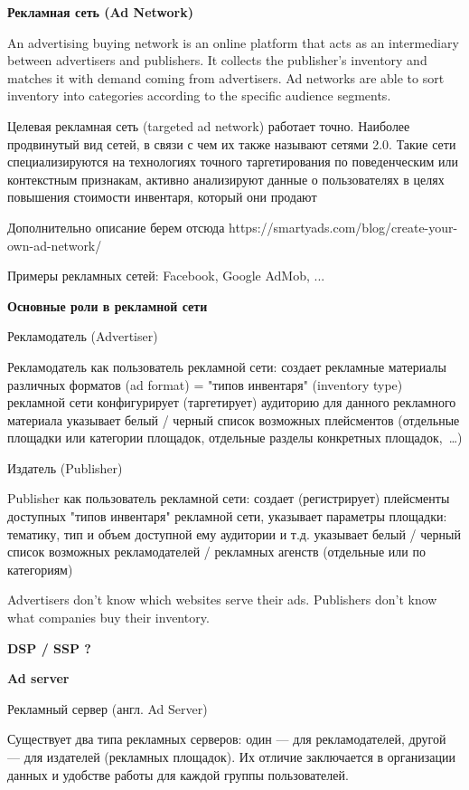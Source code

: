 \documentclass[times]{itmo-student-thesis}
\begin{document}
\textbf{Рекламная сеть (Ad Network)}

An advertising buying network is an online platform that acts as an intermediary between advertisers and publishers. It collects the publisher's inventory and matches it with demand coming from advertisers. Ad networks are able to sort inventory into categories according to the specific audience segments.

Целевая рекламная сеть (targeted ad network) работает точно. Наиболее продвинутый вид сетей, в связи с чем их также называют сетями 2.0. Такие сети специализируются на технологиях точного таргетирования по поведенческим или контекстным признакам, активно анализируют данные о пользователях в целях повышения стоимости инвентаря, который они продают

Дополнительно описание берем отсюда https://smartyads.com/blog/create-your-own-ad-network/

Примеры рекламных сетей: Facebook, Google AdMob, ...

\textbf{Основные роли в рекламной сети}

Рекламодатель (Advertiser)

Рекламодатель как пользователь рекламной сети:
создает рекламные материалы различных форматов (ad format) = "типов инвентаря" (inventory type) рекламной сети
конфигурирует (таргетирует) аудиторию для данного рекламного материала
указывает белый / черный список возможных плейсментов (отдельные площадки или категории площадок, отдельные разделы конкретных площадок, …)

Издатель (Publisher)

Publisher как пользователь рекламной сети:
создает (регистрирует) плейсменты доступных "типов инвентаря" рекламной сети, указывает параметры площадки: тематику, тип и объем доступной ему аудитории и т.д.
указывает белый / черный список возможных рекламодателей / рекламных агенств (отдельные или по категориям)

Advertisers don't know which websites serve their ads. Publishers don't know what companies buy their inventory.

\textbf{DSP / SSP ?}

\textbf{Ad server}

 Рекламный сервер (англ. Ad Server) \cite{ad-server}

Существует два типа рекламных серверов: один — для рекламодателей, другой — для издателей (рекламных площадок). Их отличие заключается в организации данных и удобстве работы для каждой группы пользователей.
\end{document}
